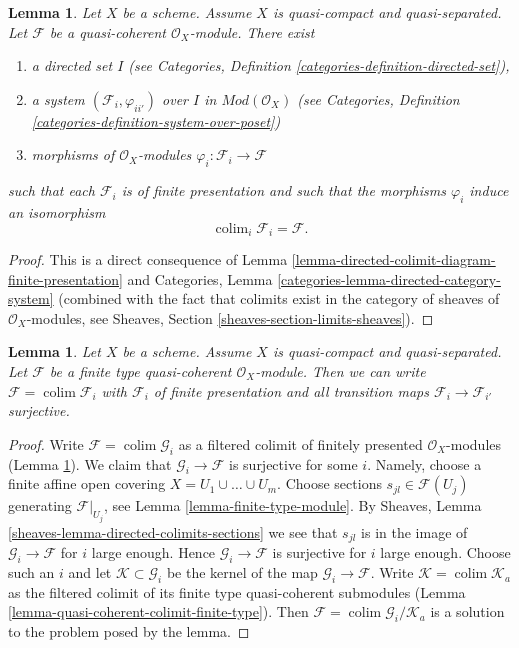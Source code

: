 \documentclass{stacks-project}
\theoremstyle{plain}
\newtheorem{lemma}[subsection]{Lemma}
\theoremstyle{definition}
\theoremstyle{remark}
\numberwithin{equation}{subsection}
\def\colim{\mathop{\mathrm{colim}}\nolimits}
\begin{document}
\begin{lemma}
\label{lemma-directed-colimit-finite-presentation}
Let $X$ be a scheme. Assume $X$ is quasi-compact and quasi-separated.
Let $\mathcal{F}$ be a quasi-coherent $\mathcal{O}_X$-module.
There exist
\begin{enumerate}
\item a directed set $I$ (see
Categories, Definition \ref{categories-definition-directed-set}),
\item a system $(\mathcal{F}_i, \varphi_{ii'})$
over $I$ in $\textit{Mod}(\mathcal{O}_X)$ (see
Categories, Definition \ref{categories-definition-system-over-poset})
\item morphisms of $\mathcal{O}_X$-modules
$\varphi_i : \mathcal{F}_i \to \mathcal{F}$
\end{enumerate}
such that each $\mathcal{F}_i$ is of finite presentation
and such that the morphisms $\varphi_i$ induce an isomorphism
$$
\colim_i \mathcal{F}_i
=
\mathcal{F}.
$$
\end{lemma}

\begin{proof}
This is a direct consequence of
Lemma \ref{lemma-directed-colimit-diagram-finite-presentation} and
Categories, Lemma \ref{categories-lemma-directed-category-system}
(combined with the fact that
colimits exist in the category of sheaves of $\mathcal{O}_X$-modules, see
Sheaves, Section \ref{sheaves-section-limits-sheaves}).
\end{proof}

\begin{lemma}
\label{lemma-finite-directed-colimit-surjective-maps}
Let $X$ be a scheme. Assume $X$ is quasi-compact and quasi-separated.
Let $\mathcal{F}$ be a finite type quasi-coherent $\mathcal{O}_X$-module.
Then we can write $\mathcal{F} = \colim \mathcal{F}_i$ with $\mathcal{F}_i$
of finite presentation and all transition maps
$\mathcal{F}_i \to \mathcal{F}_{i'}$ surjective.
\end{lemma}

\begin{proof}
Write $\mathcal{F} = \colim \mathcal{G}_i$ as a filtered colimit of
finitely presented $\mathcal{O}_X$-modules
(Lemma \ref{lemma-directed-colimit-finite-presentation}).
We claim that $\mathcal{G}_i \to \mathcal{F}$ is surjective for some $i$.
Namely, choose a finite affine open covering $X = U_1 \cup \ldots \cup U_m$.
Choose sections $s_{jl} \in \mathcal{F}(U_j)$ generating
$\mathcal{F}|_{U_j}$, see Lemma \ref{lemma-finite-type-module}.
By Sheaves, Lemma \ref{sheaves-lemma-directed-colimits-sections}
we see that $s_{jl}$ is in the image of $\mathcal{G}_i \to \mathcal{F}$
for $i$ large enough. Hence $\mathcal{G}_i \to \mathcal{F}$ is surjective
for $i$ large enough. Choose such an $i$ and let
$\mathcal{K} \subset \mathcal{G}_i$ be the kernel of the map
$\mathcal{G}_i \to \mathcal{F}$. Write $\mathcal{K} = \colim \mathcal{K}_a$
as the filtered colimit of its finite type quasi-coherent submodules
(Lemma \ref{lemma-quasi-coherent-colimit-finite-type}). Then
$\mathcal{F} = \colim \mathcal{G}_i/\mathcal{K}_a$ is a solution
to the problem posed by the lemma.
\end{proof}
\end{document}
